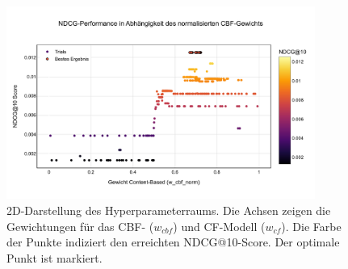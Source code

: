
\begin{figure}[H]
    \centering
    \includegraphics[width=0.9\textwidth]{content/figures/svg/2d_performance.pdf}
    \caption{2D-Darstellung des Hyperparameterraums. Die Achsen zeigen die Gewichtungen für das CBF- (\(w_{cbf}\)) und CF-Modell (\(w_{cf}\)). Die Farbe der Punkte indiziert den erreichten NDCG@10-Score. Der optimale Punkt ist markiert.}
    \label{fig:2d_performance}
\end{figure}